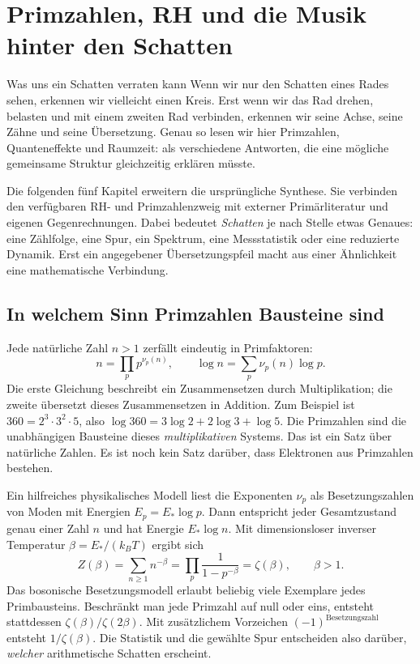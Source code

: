 \chapter{Primzahlen, RH und die Musik hinter den Schatten}
\label{ch:shadow-arithmetic}
\begin{bild}{Was uns ein Schatten verraten kann}
Wenn wir nur den Schatten eines Rades sehen, erkennen wir vielleicht einen Kreis. Erst wenn wir das Rad drehen, belasten und mit einem zweiten Rad verbinden, erkennen wir seine Achse, seine Zähne und seine Übersetzung. Genau so lesen wir hier Primzahlen, Quanteneffekte und Raumzeit: als verschiedene Antworten, die eine mögliche gemeinsame Struktur gleichzeitig erklären müsste.
\end{bild}

Die folgenden fünf Kapitel erweitern die ursprüngliche Synthese. Sie verbinden den verfügbaren RH- und Primzahlenzweig mit externer Primärliteratur und eigenen Gegenrechnungen. Dabei bedeutet \emph{Schatten} je nach Stelle etwas Genaues: eine Zählfolge, eine Spur, ein Spektrum, eine Messstatistik oder eine reduzierte Dynamik. Erst ein angegebener Übersetzungspfeil macht aus einer Ähnlichkeit eine mathematische Verbindung.

\section{In welchem Sinn Primzahlen Bausteine sind}
Jede natürliche Zahl $n>1$ zerfällt eindeutig in Primfaktoren:
\begin{equation}
 n=\prod_p p^{\nu_p(n)},\qquad \log n=\sum_p\nu_p(n)\log p.
\end{equation}
Die erste Gleichung beschreibt ein Zusammensetzen durch Multiplikation; die zweite übersetzt dieses Zusammensetzen in Addition. Zum Beispiel ist $360=2^3\cdot3^2\cdot5$, also $\log360=3\log2+2\log3+\log5$. Die Primzahlen sind die unabhängigen Bausteine dieses \emph{multiplikativen} Systems. Das ist ein Satz über natürliche Zahlen. Es ist noch kein Satz darüber, dass Elektronen aus Primzahlen bestehen.

Ein hilfreiches physikalisches Modell liest die Exponenten $\nu_p$ als Besetzungszahlen von Moden mit Energien $E_p=E_*\log p$. Dann entspricht jeder Gesamtzustand genau einer Zahl $n$ und hat Energie $E_*\log n$. Mit dimensionsloser inverser Temperatur $\beta=E_*/(k_BT)$ ergibt sich
\begin{equation}
 Z(\beta)=\sum_{n\geq1}n^{-\beta}
 =\prod_p\frac1{1-p^{-\beta}}=\zeta(\beta),\qquad \beta>1.
 \label{eq:primon-partition}
\end{equation}
Das bosonische Besetzungsmodell erlaubt beliebig viele Exemplare jedes Primbausteins. Beschränkt man jede Primzahl auf null oder eins, entsteht stattdessen $\zeta(\beta)/\zeta(2\beta)$. Mit zusätzlichem Vorzeichen $(-1)^{\text{Besetzungszahl}}$ entsteht $1/\zeta(\beta)$. Die Statistik und die gewählte Spur entscheiden also darüber, \emph{welcher} arithmetische Schatten erscheint. 

